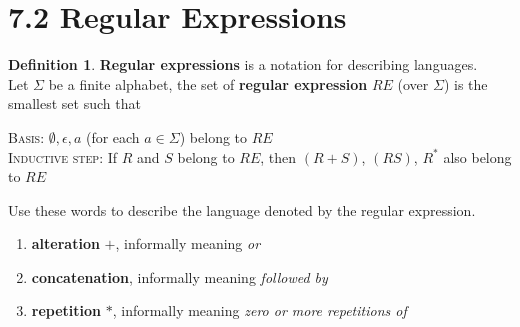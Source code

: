 \documentclass[11pt]{article}
\theoremstyle{plain}%
\theoremstyle{definition}
\newtheorem{defn}{Definition}
\theoremstyle{remark}
\begin{document}
\section*{7.2 Regular Expressions}

\begin{defn}
  \textbf{Regular expressions} is a notation for describing languages.
  \\
  Let $\Sigma$ be a finite alphabet, the set of \textbf{regular expression} $RE$ (over $\Sigma$) is the smallest set such that\\
  \begin{center}
    \textsc{Basis}: $\emptyset, \epsilon, a$ (for each $a\in \Sigma$) belong to $RE$\\
    \textsc{Inductive step}: If $R$ and $S$ belong to $RE$, then $(R+S)$, $(RS)$, $R^*$ also belong to $RE$
  \end{center}
  Use these words to describe the language denoted by the regular expression.
  \begin{enumerate}
    \item \textbf{alteration} $+$, informally meaning \textit{or}
    \item \textbf{concatenation}, informally meaning \textit{followed by}
    \item \textbf{repetition} $*$, informally meaning \textit{zero or more repetitions of}
  \end{enumerate}
\end{defn}
\end{document}
